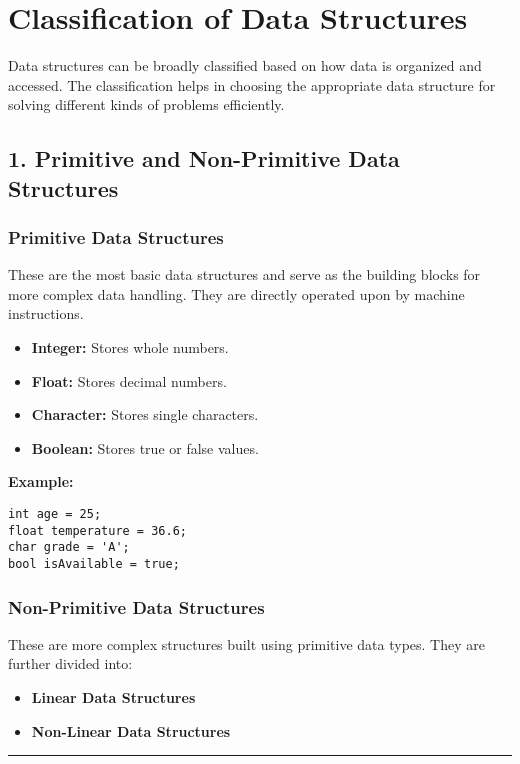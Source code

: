 \chapter{Classification of Data Structures}

Data structures can be broadly classified based on how data is organized and accessed. The classification helps in choosing the appropriate data structure for solving different kinds of problems efficiently.

\section*{\Large \textbf{1. Primitive and Non-Primitive Data Structures}}

\subsection*{\textbf{Primitive Data Structures}}
These are the most basic data structures and serve as the building blocks for more complex data handling. They are directly operated upon by machine instructions.

\begin{itemize}
  \item \textbf{Integer:} Stores whole numbers.
  \item \textbf{Float:} Stores decimal numbers.
  \item \textbf{Character:} Stores single characters.
  \item \textbf{Boolean:} Stores true or false values.
\end{itemize}

\textbf{Example:}
\begin{lstlisting}
int age = 25;
float temperature = 36.6;
char grade = 'A';
bool isAvailable = true;
\end{lstlisting}

\subsection*{\textbf{Non-Primitive Data Structures}}
These are more complex structures built using primitive data types. They are further divided into:
\begin{itemize}
  \item \textbf{Linear Data Structures}
  \item \textbf{Non-Linear Data Structures}
\end{itemize}

\vspace{0.5cm}
\hrule
\vspace{0.5cm}

